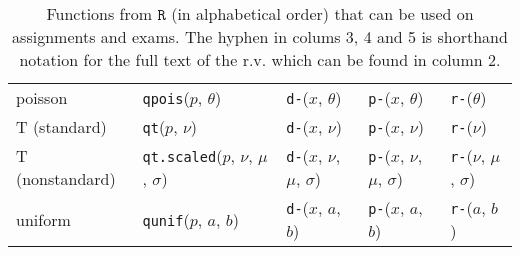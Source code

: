 \begin{table}[htp]
\begin{tabular}{l | llll}

poisson & \texttt{qpois}($p$, $\theta$) 
& \texttt{d-}($x$, $\theta$)
& \texttt{p-}($x$, $\theta$) 
& \texttt{r-}($\theta$) \\

T (standard) & \texttt{qt}($p$, $\nu$) 
& \texttt{d-}($x$, $\nu$) 
& \texttt{p-}($x$, $\nu$)
& \texttt{r-}($\nu$) \\

T (nonstandard) & \texttt{qt.scaled}($p$, $\nu$, $\mu$, $\sigma$) 
& \texttt{d-}($x$, $\nu$, $\mu$, $\sigma$)
& \texttt{p-}($x$, $\nu$, $\mu$, $\sigma$) 
& \texttt{r-}($\nu$, $\mu$, $\sigma$) \\

uniform & \texttt{qunif}($p$, $a$, $b$) 
& \texttt{d-}($x$, $a$, $b$)
& \texttt{p-}($x$, $a$, $b$) 
& \texttt{r-}($a$, $b$) \\


\end{tabular}
\caption{Functions from $\texttt{R}$ (in alphabetical order) that can be used on assignments and exams. The hyphen in colums 3, 4 and 5 is shorthand notation for the full text of the r.v. which can be found in column 2.
}
\label{tab:eqs}
\end{table}